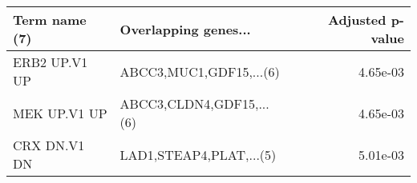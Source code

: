 \begin{tabular}{llr}
\toprule
Term name (7) &     Overlapping genes... &  Adjusted p-value \\
\midrule
ERB2 UP.V1 UP &  ABCC3,MUC1,GDF15,...(6) &          4.65e-03 \\
 MEK UP.V1 UP & ABCC3,CLDN4,GDF15,...(6) &          4.65e-03 \\
 CRX DN.V1 DN &  LAD1,STEAP4,PLAT,...(5) &          5.01e-03 \\
\bottomrule
\end{tabular}
